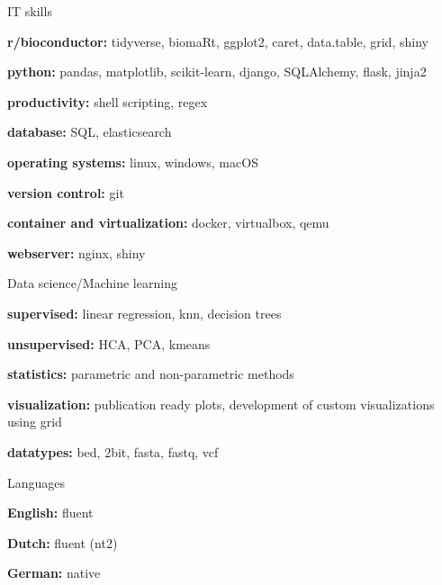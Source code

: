 

\begin{cvskills}
  \cvskill
    {IT skills} %
    {
      \begin{cvitems}
        \item {\textbf{r/bioconductor:} tidyverse, biomaRt, ggplot2, caret, data.table, grid, shiny}
        \item {\textbf{python:} pandas, matplotlib, scikit-learn, django, SQLAlchemy, flask, jinja2}
        \item {\textbf{productivity:} shell scripting, regex}
        \item {\textbf{database:} SQL, elasticsearch}
        \item {\textbf{operating systems:} linux, windows, macOS}
        \item {\textbf{version control:} git}
        \item {\textbf{container and virtualization:} docker, virtualbox, qemu}
        \item {\textbf{webserver:} nginx, shiny}
      \end{cvitems}
      }
      
  \cvskill
    {Data science/Machine learning}%
    {
      \begin{cvitems}
        \item {\textbf{supervised:} linear regression, knn, decision trees}
        \item {\textbf{unsupervised:} HCA, PCA, kmeans}
        \item {\textbf{statistics:} parametric and non-parametric methods}
        \item {\textbf{visualization:} publication ready plots, development of custom visualizations using grid}
        \item {\textbf{datatypes:} bed, 2bit, fasta, fastq, vcf}
      \end{cvitems}
    }
  \cvskill
    {Languages} %
    {
      \begin{cvitems}
        \item {\textbf{English:} fluent}
        \item {\textbf{Dutch:} fluent (nt2)}
        \item {\textbf{German:} native}
      \end{cvitems}
    }
\end{cvskills}
